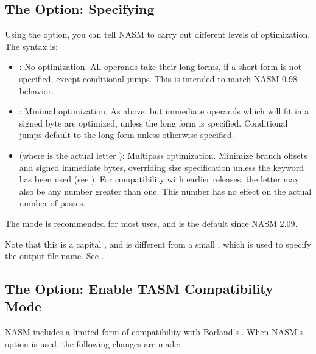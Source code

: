 \subsection{The  Option: Specifying }
\label{subsec:opt-O-cap}

Using the  option, you can tell NASM to carry out different
levels of optimization. The syntax is:

\begin{itemize}
	\item {}: No optimization. All operands take their
	long forms, if a short form is not specified, except conditional
	jumps. This is intended to match NASM 0.98 behavior.

	\item {}: Minimal optimization. As above, but immediate
	operands which will fit in a signed byte are optimized,
	unless the long form is specified. Conditional jumps default
	to the long form unless otherwise specified.

	\item {} (where  is the actual letter ):
	Multipass optimization. Minimize branch offsets and signed immediate
	bytes, overriding size specification unless the  keyword
	has been used (see ). For compatibility with earlier
	releases, the letter  may also be any number greater than
	one. This number has no effect on the actual number of passes.
\end{itemize}

The  mode is recommended for most uses, and is the default
since NASM 2.09.

Note that this is a capital , and is different from a small ,
which is used to specify the output file name. See .

\subsection{The  Option: Enable TASM Compatibility Mode}
\label{subsec:opt-t}

NASM includes a limited form of compatibility with Borland's .
When NASM's  option is used, the following changes are made:


